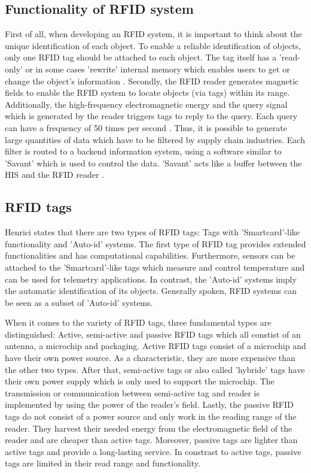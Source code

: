 \subsection{Functionality of RFID system}

First of all, when developing an RFID system, it is important to think about the unique identification of each object. To enable a reliable identification of objects, only one RFID tag should be attached to each object. The tag itself has a 'read-only' or in some cases 'rewrite' internal memory which enables users to get or change the object's information \cite{ncbi}. 
Secondly, the RFID reader generates magnetic fields to enable the RFID system to locate objects (via tags) within its range. Additionally, the high-frequency electromagnetic energy and the query signal which is generated by the reader triggers tags to reply to the query. Each query can have a frequency of 50 times per second \cite{ncbi}. Thus, it is possible to generate large quantities of data which have to be filtered by supply chain industries. Each filter is routed to a backend information system, using a software similar to 'Savant' which is used to control the data. 'Savant' acts like a buffer between the \ac{HIS} and the RFID reader \cite{ncbi}.

\subsection{RFID tags}

Henrici \cite{henrici} states that there are two types of RFID tags: Tags with 'Smartcard'-like functionality and 'Auto-id' systems. The first type of RFID tag  provides extended functionalities and has computational capabilities. Furthermore, sensors can be attached to the 'Smartcard'-like tags which measure and control temperature and can be used for telemetry applications. In contrast, the 'Auto-id' systems imply the automatic identification of its objects. Generally spoken, RFID systems can be seen as a subset of 'Auto-id' systems.

When it comes to the variety of RFID tags, three fundamental types are distinguished: Active, semi-active and passive RFID tags \cite{henrici} which all constist of an antenna, a microchip and packaging. Active RFID tags consist of a microchip and have their own power source. As a characteristic, they are more expensive than the other two types. After that, semi-active tags or also called 'hybride' tags have their own power supply which is only used to support the microchip. The transmission or communication between semi-active tag and reader is implemented by using the power of the reader's field. Lastly, the passive RFID tags do not consist of a power source and only work in the reading range of the reader. They harvest their needed energy from the electromagnetic field of the reader and are cheaper than active tags. Moreover, passive tags are lighter than active tags and provide a long-lasting service. In constrast to active tags, passive tags are limited in their read range and functionality.

